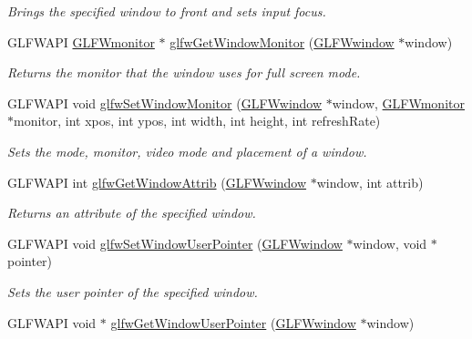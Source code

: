 \begin{DoxyCompactItemize}
\begin{DoxyCompactList}\small\item\em Brings the specified window to front and sets input focus. \end{DoxyCompactList}\item 
G\+L\+F\+W\+A\+PI \hyperlink{group__monitor_ga8d9efd1cde9426692c73fe40437d0ae3}{G\+L\+F\+Wmonitor} $\ast$ \hyperlink{group__window_gaf1525cb3bccd5789c702cc9676ef3403}{glfw\+Get\+Window\+Monitor} (\hyperlink{group__window_ga3c96d80d363e67d13a41b5d1821f3242}{G\+L\+F\+Wwindow} $\ast$window)
\begin{DoxyCompactList}\small\item\em Returns the monitor that the window uses for full screen mode. \end{DoxyCompactList}\item 
G\+L\+F\+W\+A\+PI void \hyperlink{group__window_ga12fabf78575e59c00f822f323ae0b6ae}{glfw\+Set\+Window\+Monitor} (\hyperlink{group__window_ga3c96d80d363e67d13a41b5d1821f3242}{G\+L\+F\+Wwindow} $\ast$window, \hyperlink{group__monitor_ga8d9efd1cde9426692c73fe40437d0ae3}{G\+L\+F\+Wmonitor} $\ast$monitor, int xpos, int ypos, int width, int height, int refresh\+Rate)
\begin{DoxyCompactList}\small\item\em Sets the mode, monitor, video mode and placement of a window. \end{DoxyCompactList}\item 
G\+L\+F\+W\+A\+PI int \hyperlink{group__window_ga1bb0c7e100418e284dbb800789c63d40}{glfw\+Get\+Window\+Attrib} (\hyperlink{group__window_ga3c96d80d363e67d13a41b5d1821f3242}{G\+L\+F\+Wwindow} $\ast$window, int attrib)
\begin{DoxyCompactList}\small\item\em Returns an attribute of the specified window. \end{DoxyCompactList}\item 
G\+L\+F\+W\+A\+PI void \hyperlink{group__window_gacc9e68faee3c1763b54cd9bc405cf43e}{glfw\+Set\+Window\+User\+Pointer} (\hyperlink{group__window_ga3c96d80d363e67d13a41b5d1821f3242}{G\+L\+F\+Wwindow} $\ast$window, void $\ast$pointer)
\begin{DoxyCompactList}\small\item\em Sets the user pointer of the specified window. \end{DoxyCompactList}\item 
G\+L\+F\+W\+A\+PI void $\ast$ \hyperlink{group__window_ga0a9ff3b4bf8589e9518e8816d06a8f50}{glfw\+Get\+Window\+User\+Pointer} (\hyperlink{group__window_ga3c96d80d363e67d13a41b5d1821f3242}{G\+L\+F\+Wwindow} $\ast$window)

\end{DoxyCompactItemize}
